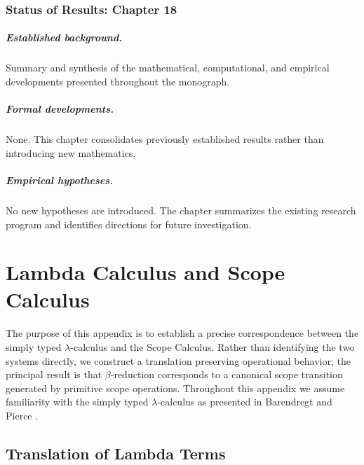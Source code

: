 \documentclass[11pt,twoside,openright]{book}
\numberwithin{equation}{chapter}
\theoremstyle{definition}
\theoremstyle{plain}
\theoremstyle{remark}
\theoremstyle{definition}
\begin{document}
\subsection*{Status of Results: Chapter 18}

\paragraph{Established background.} Summary and synthesis of the
mathematical, computational, and empirical developments presented
throughout the monograph.

\paragraph{Formal developments.} None. This chapter consolidates
previously established results rather than introducing new mathematics.

\paragraph{Empirical hypotheses.} No new hypotheses are introduced. The
chapter summarizes the existing research program and identifies
directions for future investigation.

\appendix

\chapter{Lambda Calculus and Scope Calculus}
\label{app:lambda}

The purpose of this appendix is to establish a precise correspondence
between the simply typed $\lambda$-calculus and the Scope Calculus.
Rather than identifying the two systems directly, we construct a
translation preserving operational behavior; the principal result is that
$\beta$-reduction corresponds to a canonical scope transition generated
by primitive scope operations. Throughout this appendix we assume
familiarity with the simply typed $\lambda$-calculus as presented in
Barendregt \cite{Barendregt1984} and Pierce \cite{Pierce2002}.

\section{Translation of Lambda Terms}
\end{document}
